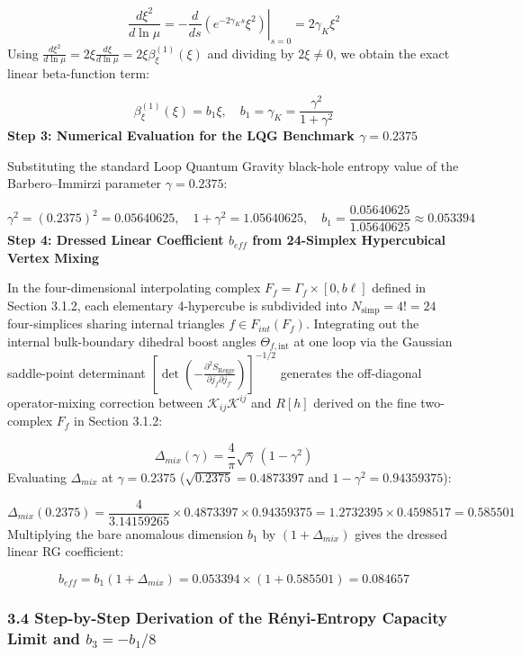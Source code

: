 \documentclass[aps,prd,onecolumn,superscriptaddress,nofootinbib,longbibliography,10pt]{revtex4-2}
\begin{document}
{{  \[ \frac{d\xi^2}{d\ln\mu} = -\left.\frac{d}{ds}\left(e^{-2\gamma_K s}\xi^2\right)\right|_{s=0} = 2\gamma_K\xi^2 \]
  Using \(\frac{d\xi^2}{d\ln\mu} = 2\xi\frac{d\xi}{d\ln\mu} = 2\xi\beta_\xi^{(1)}(\xi)\) and dividing by \(2\xi \neq 0\), we obtain the exact linear beta-function term:


  \[ \beta_\xi^{(1)}(\xi) = b_1\xi, \quad b_1 = \gamma_K = \frac{\gamma^2}{1 + \gamma^2} \]
  \textbf{Step 3: Numerical Evaluation for the LQG Benchmark \(\gamma = 0.2375\)}


  Substituting the standard Loop Quantum Gravity black-hole entropy value of the Barbero–Immirzi parameter \(\gamma = 0.2375\):


  \[ \gamma^2 = (0.2375)^2 = 0.05640625, \quad 1 + \gamma^2 = 1.05640625, \quad b_1 = \frac{0.05640625}{1.05640625} \approx 0.053394 \]
  \textbf{Step 4: Dressed Linear Coefficient \(b_{eff}\) from 24-Simplex Hypercubical Vertex Mixing}


  In the four-dimensional interpolating complex \(F_f = \Gamma_f \times [0, b\ell]\) defined in Section 3.1.2, each elementary 4-hypercube is subdivided into \(N_{\text{simp}} = 4! = 24\) four-simplices sharing internal triangles \(f \in F_{int}(F_f)\). Integrating out the internal bulk-boundary dihedral boost angles \(\Theta_{f,\text{int}}\) at one loop via the Gaussian saddle-point determinant \(\left[\det\left(-\frac{\partial^2 S_{\text{Regge}}}{\partial j_f \partial j_{f'}}\right)\right]^{-1/2}\) generates the off-diagonal operator-mixing correction between \(\mathcal{K}_{ij}\mathcal{K}^{ij}\) and \(R[h]\) derived on the fine two-complex \(F_f\) in Section 3.1.2:


  \[ \Delta_{mix}(\gamma) = \frac{4}{\pi}\sqrt{\gamma}\,(1 - \gamma^2) \]
  Evaluating \(\Delta_{mix}\) at \(\gamma = 0.2375\) (\(\sqrt{0.2375} = 0.4873397\) and \(1 - \gamma^2 = 0.94359375\)):


  \[ \Delta_{mix}(0.2375) = \frac{4}{3.14159265} \times 0.4873397 \times 0.94359375 = 1.2732395 \times 0.4598517 = 0.585501 \]
  Multiplying the bare anomalous dimension \(b_1\) by \((1 + \Delta_{mix})\) gives the dressed linear RG coefficient:


  \[ b_{eff} = b_1(1 + \Delta_{mix}) = 0.053394 \times (1 + 0.585501) = 0.084657 \]
  
  
\subsubsection*{3.4 Step-by-Step Derivation of the Rényi-Entropy Capacity Limit and \(b_3 = -b_1/8\)}

}}
\end{document}
